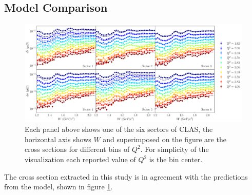 \subsection{Model Comparison}

\begin{figure}
	\centering
	\label{fig-inclusive-xs} 
	\includegraphics[width=\textwidth]{image/plots/inclusive/inclusive_xs.pdf}
	\caption{Each panel above shows one of the six sectors of CLAS, the horizontal axis shows $W$ and superimposed on the figure are the cross sections for different bins of $Q^2$.  For simplicity of the visualization each reported value of $Q^2$ is the bin center.}
\end{figure}

The cross section extracted in this study is in agreement with the predictions from the model, shown in figure \ref{fig-inclusive-xs}.  


